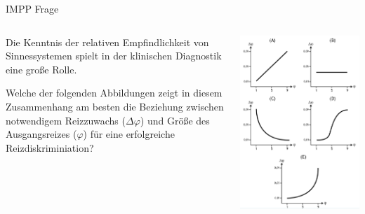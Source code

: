 \documentclass[aspectratio=169]{beamer}
\begin{document}
\begin{frame}{IMPP Frage}


\begin{columns}[c]
\begin{column}{6cm}
Die Kenntnis der relativen Empfindlichkeit von Sinnessystemen spielt in der klinischen Diagnostik eine große Rolle. 

Welche der folgenden Abbildungen zeigt in diesem Zusammenhang am besten die Beziehung zwischen notwendigem Reizzuwachs (\( \Delta \varphi \)) und Größe des Ausgangsreizes (\(\varphi\)) für eine erfolgreiche Reizdiskriminiation? 


\end{column}


\begin{column}{5cm}
\begin{center}
    \includegraphics[width=\textwidth]{weber_IMPP.png}
\end{center}
\end{column}

\end{columns}
    
\end{frame}
\end{document}
